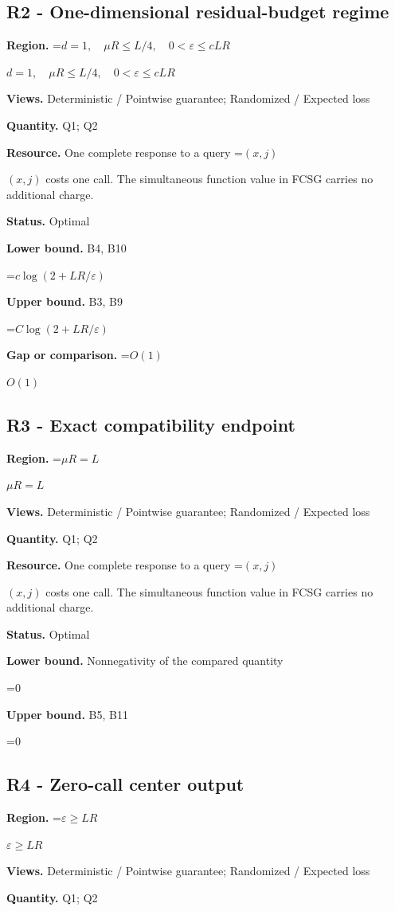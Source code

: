 \documentclass[10pt,a4paper]{article}
\newcommand{\AtlasMath}[1]{\par\begingroup\centering\setbox0=\hbox{$\displaystyle #1$}\ifdim\wd0>1.4\linewidth\typeout{ATLAS WIDE FORMULA: \the\wd0}\fi\ifdim\wd0>\linewidth\resizebox{\linewidth}{!}{\box0}\else\box0\fi\par\endgroup}
\newcommand{\AtlasInlineMath}[1]{\begingroup\setbox0=\hbox{$#1$}\ifdim\wd0>.4\linewidth\endgroup\AtlasMath{#1}\else\endgroup$#1$\fi}
\begin{document}
\subsection{R2 - One-dimensional residual-budget regime}
\textbf{Region.} \AtlasInlineMath{d=1,\quad\mu R\le L/4,\quad0<\varepsilon\le cLR}

\textbf{Views.} Deterministic / Pointwise guarantee; Randomized / Expected loss

\textbf{Quantity.} Q1; Q2

\textbf{Resource.} One complete response to a query \AtlasInlineMath{(x,j)} costs one call. The simultaneous function value in FCSG carries no additional charge.

\textbf{Status.} Optimal

\textbf{Lower bound.} B4, B10

\AtlasMath{c\log(2+LR/\varepsilon)}
\textbf{Upper bound.} B3, B9

\AtlasMath{C\log(2+LR/\varepsilon)}
\textbf{Gap or comparison.} \AtlasInlineMath{O(1)}

\subsection{R3 - Exact compatibility endpoint}
\textbf{Region.} \AtlasInlineMath{\mu R=L}

\textbf{Views.} Deterministic / Pointwise guarantee; Randomized / Expected loss

\textbf{Quantity.} Q1; Q2

\textbf{Resource.} One complete response to a query \AtlasInlineMath{(x,j)} costs one call. The simultaneous function value in FCSG carries no additional charge.

\textbf{Status.} Optimal

\textbf{Lower bound.} Nonnegativity of the compared quantity

\AtlasMath{0}
\textbf{Upper bound.} B5, B11

\AtlasMath{0}
\subsection{R4 - Zero-call center output}
\textbf{Region.} \AtlasInlineMath{\varepsilon\ge LR}

\textbf{Views.} Deterministic / Pointwise guarantee; Randomized / Expected loss

\textbf{Quantity.} Q1; Q2
\end{document}
